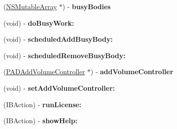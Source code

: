 \begin{DoxyCompactItemize}
\item 
\hypertarget{interface_app_controller_ae29225dd8eeb4c222bf08267fd11f0bb}{
(\hyperlink{class_n_s_mutable_array}{NSMutableArray} $\ast$) -\/ {\bfseries busyBodies}}
\label{interface_app_controller_ae29225dd8eeb4c222bf08267fd11f0bb}

\item 
\hypertarget{interface_app_controller_a365a8ff33f99bd3e28a3c821a18fdced}{
(void) -\/ {\bfseries doBusyWork:}}
\label{interface_app_controller_a365a8ff33f99bd3e28a3c821a18fdced}

\item 
\hypertarget{interface_app_controller_a8bf326421d4cbaf3ac34f018588fe5b8}{
(void) -\/ {\bfseries scheduledAddBusyBody:}}
\label{interface_app_controller_a8bf326421d4cbaf3ac34f018588fe5b8}

\item 
\hypertarget{interface_app_controller_adfcf683477e9e3b6e3ae9de8848a1726}{
(void) -\/ {\bfseries scheduledRemoveBusyBody:}}
\label{interface_app_controller_adfcf683477e9e3b6e3ae9de8848a1726}

\item 
\hypertarget{interface_app_controller_a2fe23aadad2ea28f51d942bfa2ba7c9a}{
(\hyperlink{interface_p_a_d_add_volume_controller}{PADAddVolumeController} $\ast$) -\/ {\bfseries addVolumeController}}
\label{interface_app_controller_a2fe23aadad2ea28f51d942bfa2ba7c9a}

\item 
\hypertarget{interface_app_controller_afa6ccef913c1590e061a567f755ab8d2}{
(void) -\/ {\bfseries setAddVolumeController:}}
\label{interface_app_controller_afa6ccef913c1590e061a567f755ab8d2}

\item 
\hypertarget{interface_app_controller_a6a1dad8da899bd43744fdbee301a46f2}{
(IBAction) -\/ {\bfseries runLicense:}}
\label{interface_app_controller_a6a1dad8da899bd43744fdbee301a46f2}

\item 
\hypertarget{interface_app_controller_a7a8a6daad93c5181921c91396877183b}{
(IBAction) -\/ {\bfseries showHelp:}}
\label{interface_app_controller_a7a8a6daad93c5181921c91396877183b}

\end{DoxyCompactItemize}

